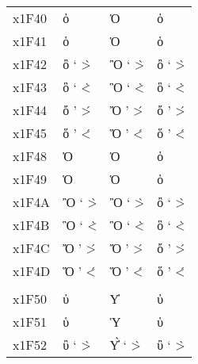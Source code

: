 \documentclass[a4paper]{article}
\newcommand*{\Greek}{\foreignlanguage{greek}}
\newcommand*{\Greek}{\ensuregreek}
\newcommand*{\Cases}[1]{%
  & \Greek{#1} & \Greek{\MakeUppercase{#1}} & \Greek{\MakeLowercase{#1}}
}
\begin{document}
\begin{longtable}{llll}
  x1F40 \Cases{ ὀ  \accpsili{\omicron}                          \>{\omicron}                                           } \\
  x1F41 \Cases{ ὁ  \accdasia{\omicron}                          \<{\omicron}                                           } \\
  x1F42 \Cases{ ὂ  \accpsilivaria{\omicron}                     \>`{\omicron}               \`>{\omicron}              } \\
  x1F43 \Cases{ ὃ  \accdasiavaria{\omicron}                     \<`{\omicron}               \`<{\omicron}              } \\
  x1F44 \Cases{ ὄ  \accpsilioxia{\omicron}                      \>'{\omicron}               \'>{\omicron}              } \\
  x1F45 \Cases{ ὅ  \accdasiaoxia{\omicron}                      \<'{\omicron}               \'<{\omicron}              } \\
  x1F48 \Cases{ Ὀ  \accpsili{\Omicron}                          \>{\Omicron}                                           } \\
  x1F49 \Cases{ Ὁ  \accdasia{\Omicron}                          \<{\Omicron}                                           } \\
  x1F4A \Cases{ Ὂ  \accpsilivaria{\Omicron}                     \>`{\Omicron}               \`>{\Omicron}              } \\
  x1F4B \Cases{ Ὃ  \accdasiavaria{\Omicron}                     \<`{\Omicron}               \`<{\Omicron}              } \\
  x1F4C \Cases{ Ὄ  \accpsilioxia{\Omicron}                      \>'{\Omicron}               \'>{\Omicron}              } \\
  x1F4D \Cases{ Ὅ  \accdasiaoxia{\Omicron}                      \<'{\Omicron}               \'<{\Omicron}              } \\
                                                                                                                         \\
  x1F50 \Cases{ ὐ  \accpsili{\upsilon}                          \>{\upsilon}                                           } \\
  x1F51 \Cases{ ὑ  \accdasia{\upsilon}                          \<{\upsilon}                                           } \\
  x1F52 \Cases{ ὒ  \accpsilivaria{\upsilon}                     \>`{\upsilon}               \`>{\upsilon}              } \\

\end{longtable}
\end{document}
